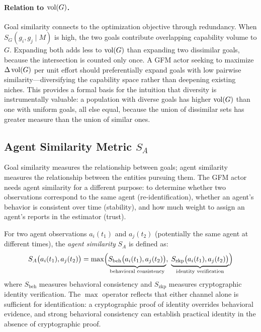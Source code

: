 \paragraph{Relation to $\operatorname{vol}(G)$.} Goal similarity connects to the optimization objective through redundancy. When $S_G(g_i, g_j \mid M)$ is high, the two goals contribute overlapping capability volume to $G$. Expanding both adds less to $\operatorname{vol}(G)$ than expanding two dissimilar goals, because the intersection is counted only once. A GFM actor seeking to maximize $\Delta \operatorname{vol}(G)$ per unit effort should preferentially expand goals with low pairwise similarity---diversifying the capability space rather than deepening existing niches. This provides a formal basis for the intuition that diversity is instrumentally valuable: a population with diverse goals has higher $\operatorname{vol}(G)$ than one with uniform goals, all else equal, because the union of dissimilar sets has greater measure than the union of similar ones.


\subsection{Agent Similarity Metric \texorpdfstring{$S_A$}{S\_A}}
\label{app:agent_similarity_metric}

Goal similarity measures the relationship between goals; agent similarity measures the relationship between the entities pursuing them. The GFM actor needs agent similarity for a different purpose: to determine whether two observations correspond to the same agent (re-identification), whether an agent's behavior is consistent over time (stability), and how much weight to assign an agent's reports in the estimator (trust).

\begin{definition}
\label{def:agent_similarity}
For two agent observations $a_i(t_1)$ and $a_j(t_2)$ (potentially the same agent at different times), the \emph{agent similarity} $S_A$ is defined as:
\begin{equation}
\label{eq:agent_similarity}
S_A\bigl(a_i(t_1), a_j(t_2)\bigr) = \max\Bigl(\underbrace{S_{\mathrm{beh}}\bigl(a_i(t_1), a_j(t_2)\bigr)}_{\text{behavioral consistency}},\; \underbrace{S_{\mathrm{zkp}}\bigl(a_i(t_1), a_j(t_2)\bigr)}_{\text{identity verification}}\Bigr)
\end{equation}
where $S_{\mathrm{beh}}$ measures behavioral consistency and $S_{\mathrm{zkp}}$ measures cryptographic identity verification. The $\max$ operator reflects that either channel alone is sufficient for identification: a cryptographic proof of identity overrides behavioral evidence, and strong behavioral consistency can establish practical identity in the absence of cryptographic proof.
\end{definition}

